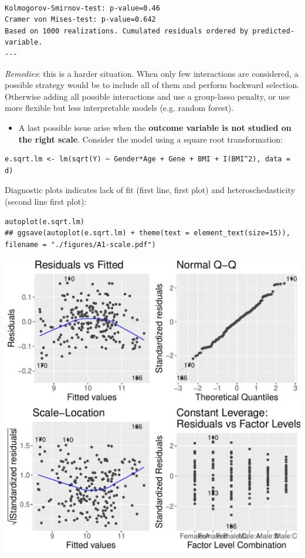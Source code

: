 \documentclass[12pt]{article}
\begin{document}
\begin{verbatim}

Kolmogorov-Smirnov-test: p-value=0.46
Cramer von Mises-test: p-value=0.642
Based on 1000 realizations. Cumulated residuals ordered by predicted-variable.
---
\end{verbatim}

\emph{Remedies}: this is a harder situation. When only few interactions are
considered, a possible strategy would be to include all of them and
perform backward selection. Otherwise adding all possible
interactions and use a group-lasso penalty, or use more flexible but
less interpretable models (e.g. random forest).

\bigskip

\begin{itemize}
\item A last possible issue arise when the \textbf{outcome variable is not
studied on the right scale}. Consider the model using a square root
transformation:
\end{itemize}
\lstset{language=r,label= ,caption= ,captionpos=b,numbers=none}
\begin{lstlisting}
e.sqrt.lm <- lm(sqrt(Y) ~ Gender*Age + Gene + BMI + I(BMI^2), data = d)
\end{lstlisting}

Diagnostic plots indicates lack of fit (first line, first plot) and
heteroschedasticity (second line first plot):
\lstset{language=r,label= ,caption= ,captionpos=b,numbers=none}
\begin{lstlisting}
autoplot(e.sqrt.lm)
## ggsave(autoplot(e.sqrt.lm) + theme(text = element_text(size=15)), filename = "./figures/A1-scale.pdf")
\end{lstlisting}

\begin{center}
\includegraphics[width=1\textwidth]{./figures/A1-scale.pdf}
\end{center} 
\end{document}

